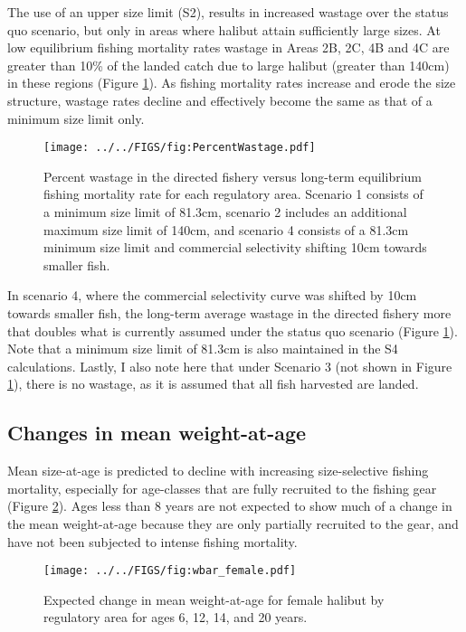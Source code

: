 The use of an upper size limit (S2), results in increased wastage over the status quo scenario, but only in areas where halibut attain sufficiently large sizes. At low equilibrium fishing mortality rates wastage in Areas 2B, 2C, 4B and 4C are greater than 10\% of the landed catch due to large halibut (greater than 140cm) in these regions (Figure \ref{fig:FIGS_fig:PercentWastage}).  As fishing mortality rates increase and erode the size structure, wastage rates decline and effectively become the same as that of a minimum size limit only.  

\begin{figure}[htbp]
	\centering
		\texttt{[image: ../../FIGS/fig:PercentWastage.pdf]}
	\caption{Percent wastage in the directed fishery versus long-term equilibrium fishing mortality rate for each regulatory area. Scenario 1 consists of a minimum size limit of 81.3cm, scenario 2 includes an additional maximum size limit of 140cm, and scenario 4 consists of a 81.3cm minimum size limit and commercial selectivity shifting 10cm towards smaller fish.}
	\label{fig:FIGS_fig:PercentWastage}
\end{figure}

In scenario 4, where the commercial selectivity curve was shifted by 10cm towards smaller fish, the long-term average wastage in the directed fishery more that doubles what is currently assumed under the status quo scenario (Figure \ref{fig:FIGS_fig:PercentWastage}). Note that a minimum size limit of 81.3cm is also maintained in the S4 calculations.  Lastly, I also note here that under Scenario 3 (not shown in Figure \ref{fig:FIGS_fig:PercentWastage}), there is no wastage, as it is assumed that all fish harvested are landed.


\subsection*{Changes in mean weight-at-age} %
\label{sub:changes_in_mean_weight_at_age}

Mean size-at-age is predicted to decline with increasing size-selective fishing mortality, especially for age-classes that are fully recruited to the fishing gear (Figure \ref{fig:FIGS_fig:wbar_female}).  Ages less than 8 years are not expected to show much of a change in the mean weight-at-age because they are only partially recruited to the gear, and have not been subjected to intense fishing mortality.
\begin{figure}[htbp]
	\centering
		\texttt{[image: ../../FIGS/fig:wbar\_female.pdf]}
	\caption{Expected change in mean weight-at-age for female halibut by regulatory area for ages 6, 12, 14, and 20 years.}
	\label{fig:FIGS_fig:wbar_female}
\end{figure}

